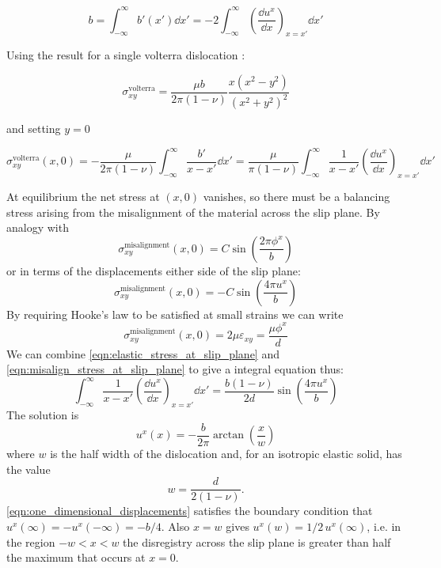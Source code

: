 \begin{equation}
b = \int_{-\infty}^{\infty} b'(x') \dd x' = -2\int^{\infty}_{-\infty} \left( \! \frac{\dd u^x}{\dd x} \right)_{x=x'} \dd x' 
\end{equation}

Using the result for a single volterra dislocation \cite{hirth_lothe_1982_volterra_stress_field}:

\begin{equation}
\sigma^{\text{volterra}}_{xy} = \frac{\mu b}{2\pi (1-\nu)} \frac{x(x^2 - y^2)}{(x^2+y^2)^2}
\end{equation}

and setting $y=0$

\begin{equation}
\sigma^{\text{volterra}}_{xy}(x,0) = -\frac{\mu}{2\pi(1-\nu)} \int^{\infty}_{-\infty} \frac{b'}{x-x'} \!\dd x' =  \frac{\mu}{\pi(1-\nu)} \int^{\infty}_{-\infty} \frac{1}{x-x'} \left(\!\frac{\dd u^x}{\dd x}\right)_{x=x'} \!\dd x'
\label{eqn:elastic_stress_at_slip_plane}
\end{equation}

At equilibrium the net stress at $(x,0)$ vanishes, so there must be a balancing stress arising from the misalignment of the material across the slip plane. By analogy with \citet{Frenkel1926}
\begin{equation}
\sigma_{xy}^{\text{misalignment}}(x,0) = C \sin \left( \frac{2\pi \phi^x}{b} \right)
\end{equation}
or in terms of the displacements either side of the slip plane:
\begin{equation}
\sigma_{xy}^{\text{misalignment}}(x,0) = -C \sin \left( \frac{4\pi u^x}{b} \right)
\end{equation}
By requiring Hooke's law to be satisfied at small strains we can write
\begin{equation}
\sigma_{xy}^{\text{misalignment}}(x,0) = 2 \mu \varepsilon_{xy} = \frac{\mu{}\phi^x}{d}
\label{eqn:misalign_stress_at_slip_plane}
\end{equation}
We can combine \autoref{eqn:elastic_stress_at_slip_plane} and \autoref{eqn:misalign_stress_at_slip_plane} to give a integral equation thus:
\begin{equation}
\int^{\infty}_{-\infty} \frac{1}{x-x'} \left(\!\frac{\dd u^x}{\dd x}\right)_{x=x'} \dd x' = \frac{b(1-\nu)}{2d} \sin\left(\frac{4\pi{}u^x}{b}\right)
\end{equation}
The solution is \cite{hirth_lothe1982peierls_displacements,Eshelby1949}
\begin{equation}
u^x(x) = -\frac{b}{2\pi} \arctan \left( \frac{x}{w} \right)
\label{eqn:one_dimensional_displacements}
\end{equation}
where $w$ is the half width of the dislocation and, for an isotropic elastic solid, has the value
\begin{equation}
w = \frac{d}{2(1-\nu)}.\label{eqn:half_width}
\end{equation}
\autoref{eqn:one_dimensional_displacements} satisfies the boundary condition that $u^x(\infty) = - u^x(-\infty) = -b/4$. Also $x=w$ gives $u^x(w)=1/2\, u^x(\infty)$, i.e. in the region $-w < x < w$ the disregistry across the slip plane is greater than half the maximum that occurs at $x=0$.

